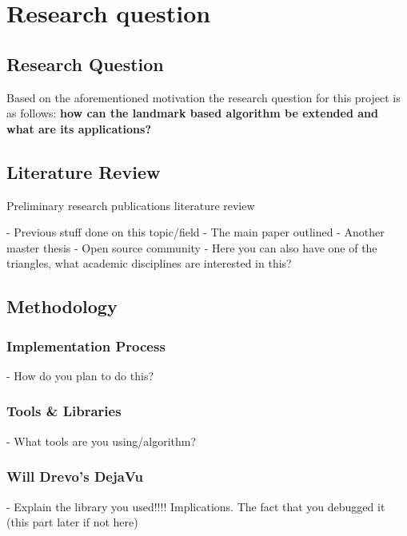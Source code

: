 
\chapter{Research question} %



\section{Research Question}

Based on the aforementioned motivation the research question for this project is as follows: \textbf{how can the landmark based algorithm be extended and what are its applications?}

\section{Literature Review}
Preliminary research
publications
literature review

-	Previous stuff done on this topic/field
-	The main paper outlined
-	Another master thesis
-	Open source community
-	Here you can also have one of the triangles, what academic disciplines are interested in this?

\section{Methodology}

\subsection{Implementation Process}
-	How do you plan to do this?
\subsection{Tools \& Libraries}
-	What tools are you using/algorithm?

\subsection{Will Drevo's DejaVu}
-	Explain the library you used!!!! Implications. The fact that you debugged it (this part later if not here)
